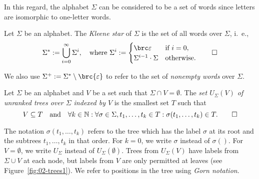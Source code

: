 In this regard, the alphabet $\Sigma$ can be considered to be a set of words
since letters are isomorphic to one-letter words.

\begin{definition}
 Let $\Sigma$ be an alphabet. The \emph{Kleene star} of $\Sigma$ is the set of
 all words over $\Sigma$, i.~e.,
 \[
  \Sigma^* := \bigcup_{i=0}^\infty \Sigma^i, \quad
  \text{where }\Sigma^i := \begin{cases}
   \brc\eps & \text{if } i = 0, \\
   \Sigma^{i-1}\cdot\Sigma & \text{otherwise}.
  \end{cases}\qedhere
 \]
\end{definition}

We also use $\Sigma^+ := \Sigma^* \setminus\brc{\eps}$ to refer to the set of
\emph{nonempty words} over $\Sigma$.

\begin{definition}
 Let $\Sigma$ be an alphabet and $V$ be a set such that $\Sigma\cap
 V=\emptyset$. The \emph{set $U_\Sigma(V)$ of unranked trees over $\Sigma$
 indexed by $V$} is the smallest set $T$ such that
 \[
  V \subseteq T \quad\text{and}\quad \forall k\in\mathbb N: \forall \sigma\in\Sigma, t_1,\ldots,t_k\in T: \sigma(t_1,\ldots,t_k)\in T.
  \qedhere
 \]
\end{definition}

The notation $\sigma(t_1,\ldots,t_k)$ refers to the tree which has the label
$\sigma$ at its root and the subtrees $t_1,\ldots,t_k$ in that order. For
$k=0$, we write $\sigma$ instead of $\sigma()$. For $V=\emptyset$, we write
$U_\Sigma$ instead of $U_\Sigma(\emptyset)$. Trees from $U_\Sigma(V)$ have
labels from $\Sigma\cup V$ at each node, but labels from $V$ are only permitted
at leaves (see Figure~\ref{fig:02-trees1}). We refer to positions in the tree
using \emph{Gorn notation}.

